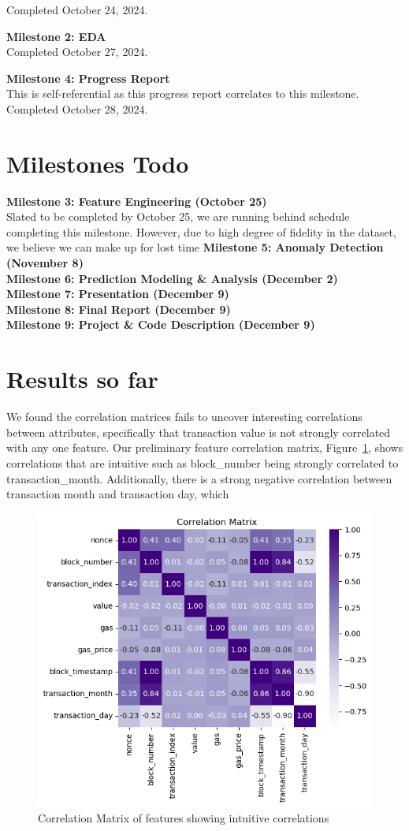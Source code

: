 \documentclass[sigconf]{acmart}
\begin{document}
Completed October 24, 2024.

\textbf{Milestone 2: EDA}\\
Completed October 27, 2024.

\textbf{Milestone 4: Progress Report}\\
This is self-referential as this progress report correlates to this milestone. Completed October 28, 2024.

\section{Milestones Todo}
\textbf{Milestone 3: Feature Engineering (October 25)}\\
Slated to be completed by October 25, we are running behind schedule completing this milestone. However, due to high degree of fidelity in the dataset, we believe we can make up for lost time
\textbf{Milestone 5: Anomaly Detection (November 8)}\\
\textbf{Milestone 6: Prediction Modeling \& Analysis (December 2)}\\
\textbf{Milestone 7: Presentation (December 9)}\\
\textbf{Milestone 8: Final Report (December 9)}\\
\textbf{Milestone 9: Project \& Code Description (December 9)}\\

\section{Results so far}
We found the correlation matrices fails to uncover interesting correlations between attributes, specifically that transaction value is not strongly correlated with any one feature. Our preliminary feature correlation matrix, Figure~\ref{fig:m4CorrelationMatrix}, shows correlations that are intuitive such as block\_number being strongly correlated to transaction\_month. Additionally, there is a strong negative correlation between transaction month and transaction day, which 

\begin{figure}[h]
    \centering
    \includegraphics[width=0.8\linewidth]{m4-correlation-matrix.png}
    \caption{Correlation Matrix of features showing intuitive correlations}
    \label{fig:m4CorrelationMatrix}
\end{figure}
\end{document}
